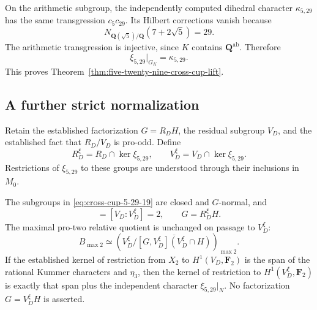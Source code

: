 On the arithmetic subgroup, the independently computed
dihedral character \(\kappa_{5,29}\) has the same
transgression \(c_5c_{29}\).
Its Hilbert corrections vanish because
\[
                         N_{\mathbf Q(\sqrt5)/\mathbf Q}
                                  (7+2\sqrt5)=29.
\]
The arithmetic transgression is injective, since \(K\)
contains \(\mathbf Q^{\mathrm{ab}}\).
Therefore
\[
                         \xi_{5,29}|_{G_K}=\kappa_{5,29}.
\]
This proves Theorem~\ref{thm:five-twenty-nine-cross-cup-lift}.

\subsection{A further strict normalization}

Retain the established factorization \(G=R_DH\), the
residual subgroup \(V_D\), and the established
fact that \(R_D/V_D\) is pro-odd.
Define
\begin{equation}
 R_D^\xi=R_D\cap\ker\xi_{5,29},\qquad
 V_D^\xi=V_D\cap\ker\xi_{5,29}.                            \label{eq:cross-cup-5-29-19}
\end{equation}
Restrictions of \(\xi_{5,29}\) to these groups are
understood through their inclusions in \(M_0\).

\begin{corollary}\label{cor:cross-cup-strict-normalization}
The subgroups in \eqref{eq:cross-cup-5-29-19} are closed and \(G\)-normal, and
\begin{equation}
 [R_D:R_D^\xi]=[V_D:V_D^\xi]=2,\qquad
                         G=R_D^\xi H.                     \label{eq:cross-cup-5-29-20}
\end{equation}
The maximal pro-two relative quotient is unchanged
on passage to \(V_D^\xi\):
\begin{equation}
 B_{\max2}\simeq
 \left(
 V_D^\xi/
 \overline{[G,V_D^\xi](V_D^\xi\cap H)}
 \right)_{\max2}.                                         \label{eq:cross-cup-5-29-21}
\end{equation}
If the established kernel of restriction from \(X_2\)
to \(H^1(V_D,\mathbf F_2)\) is the span of the rational
Kummer characters and \(\eta_3\), then the kernel of
restriction to \(H^1(V_D^\xi,\mathbf F_2)\) is exactly
that span plus the independent character
\(\xi_{5,29}|_N\).
No factorization \(G=V_D^\xi H\) is asserted.
\end{corollary}

